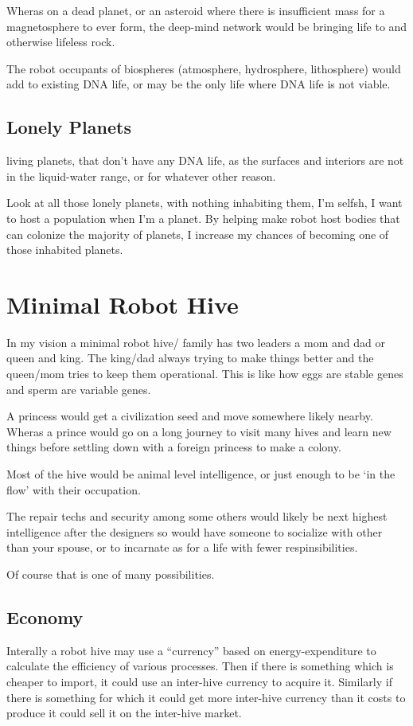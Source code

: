 Wheras on a dead planet, or an asteroid where there is insufficient mass for a
magnetosphere to ever form, the deep-mind network would be bringing life to and
otherwise lifeless rock.

The robot occupants of biospheres (atmosphere, hydrosphere, lithosphere) would
add to existing DNA life, or may be the only life where DNA life is not viable. 

\subsection{Lonely Planets}
living planets, that don't have any DNA life, as the surfaces and interiors are
not in the liquid-water range, or for whatever other reason.

Look at all those lonely planets, with nothing inhabiting them, I'm selfsh, I
want to host a population when I'm a planet. By helping make robot host bodies
that can colonize the majority of planets, I increase my chances of becoming one
of those inhabited planets.

\section{Minimal Robot Hive}
 In my vision a minimal robot hive/ family has two leaders a mom and dad or
 queen and king. The king/dad always trying to make things better and the
 queen/mom tries to keep them operational.
 This is like how eggs are stable genes and sperm are variable genes.

 A princess would get a civilization seed and move somewhere likely nearby.
 Wheras a prince would go on a long journey to visit many hives and learn new
 things before settling down with a foreign princess to make a colony.

 Most of the hive would be animal level intelligence, or just enough to be `in
 the flow' with their occupation.

 The repair techs and security among some others would likely be next highest
 intelligence after the designers so would have someone to socialize with other
 than your spouse, or to incarnate as for a life with fewer respinsibilities.

 Of course that is one of many possibilities.
 \subsection{Economy}

 Interally a robot hive may use a ``currency'' based on energy-expenditure to
 calculate the efficiency of various processes.  Then if there is something
 which is cheaper to import, it could use an inter-hive currency to acquire it.
 Similarly if there is something for which it could get more inter-hive currency
 than it costs to produce it could sell it on the inter-hive market.


